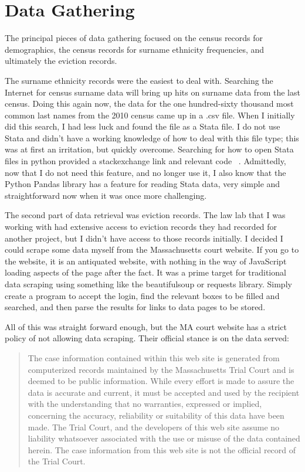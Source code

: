 \chapter{Data Gathering}
\label{chap:datagathering}
The principal pieces of data gathering focused on the census records for demographics, the census records for surname ethnicity frequencies, and ultimately the eviction records.\par

The surname ethnicity records were the easiest to deal with.  Searching the Internet for census surname data will bring up hits on surname data from the last census.  Doing this again now, the data for the one hundred-sixty thousand most common last names from the 2010 census came up in a .csv file.  When I initially did this search, I had less luck and found the file as a Stata file.  I do not use Stata and didn't have a working knowledge of how to deal with this file type; this was at first an irritation, but quickly overcome.  Searching for how to open Stata files in python provided a stackexchange link and relevant code ~\cite{WEBSITE:13}.  Admittedly, now that I do not need this feature, and no longer use it, I also know that the Python Pandas library has a feature for reading Stata data, very simple and straightforward now when it was once more challenging. \par

The second part of data retrieval was eviction records.  The law lab that I was working with had extensive access to eviction records they had recorded for another project, but I didn’t have access to those records initially.  I decided I could scrape some data myself from the Massachusetts court website.  If you go to the website, it is an antiquated website, with nothing in the way of JavaScript loading aspects of the page after the fact.  It was a prime target for traditional data scraping using something like the beautifulsoup or requests library.  Simply create a program to accept the login, find the relevant boxes to be filled and searched, and then parse the results for links to data pages to be stored. \par
All of this was straight forward enough, but the MA court website has a strict policy of not allowing data scraping.  Their official stance is on the data served:

\begin{quote}
The case information contained within this web site is generated from computerized records maintained by the Massachusetts Trial Court and is deemed to be public information. While every effort is made to assure the data is accurate and current, it must be accepted and used by the recipient with the understanding that no warranties, expressed or implied, concerning the accuracy, reliability or suitability of this data have been made. The Trial Court, and the developers of this web site assume no liability whatsoever associated with the use or misuse of the data contained herein.  The case information from this web site is not the official record of the Trial Court. ~\citep{WEBSITE:12} 
\end{quote} \par

